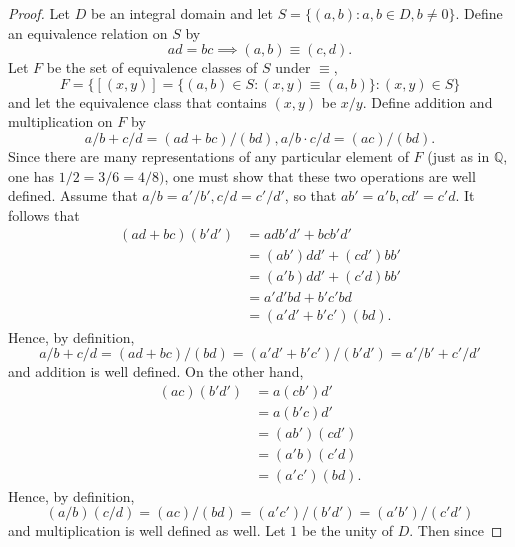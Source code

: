 \documentclass{article}
\theoremstyle{definition}
\begin{document}
\begin{proof}
      Let $D$ be an integral domain and let $S=\{(a,b):a,b\in D,b\neq0\}$. Define an equivalence relation on $S$ by
      \begin{equation*}
          ad=bc \implies (a,b)\equiv(c,d).
      \end{equation*}
      Let $F$ be the set of equivalence classes of $S$ under $\equiv$,
      \begin{equation*}
          F=\{[(x,y)]=\{(a,b)\in S: (x,y)\equiv(a,b)\}: (x,y)\in S\}
      \end{equation*}
      and let the equivalence class that contains $(x,y)$ be $x/y$. Define addition and multiplication on $F$ by
      \begin{equation*}
          a/b+c/d=(ad+bc)/(bd), a/b\cdot c/d=(ac)/(bd).
      \end{equation*}
      Since there are many representations of any particular element of $F$ (just as in $\mathbb{Q}$, one has $1/2=3/6=4/8)$, one must show that these two operations are well defined. Assume that $a/b=a'/b',c/d=c'/d'$, so that $ab'=a'b,cd'=c'd$. It follows that
      \begin{align*}
          (ad+bc)(b'd') &= adb'd'+bcb'd' \\
          &= (ab')dd'+(cd')bb' \\
          &= (a'b)dd'+(c'd)bb' \\
          &= a'd'bd+b'c'bd \\
          &= (a'd'+b'c')(bd).
      \end{align*}
      Hence, by definition,
      \begin{equation*}
          a/b+c/d=(ad+bc)/(bd)=(a'd'+b'c')/(b'd')=a'/b'+c'/d'
      \end{equation*}
      and addition is well defined. On the other hand,
      \begin{align*}
          (ac)(b'd')&=a(cb')d' \\
          &=a(b'c)d' \\
          &=(ab')(cd') \\
          &=(a'b)(c'd) \\
          &=(a'c')(bd). 
      \end{align*}
      Hence, by definition,
      \begin{equation*}
          (a/b)(c/d)=(ac)/(bd)=(a'c')/(b'd')=(a'b')/(c'd')
      \end{equation*}
      and multiplication is well defined as well. Let $1$ be the unity of $D$. Then since 

\end{proof}
\end{document}
